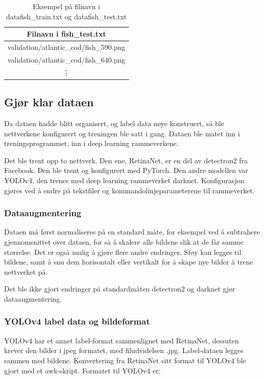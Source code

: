 \begin{table}[b]
\bigskip
\centering
\caption{Eksempel på filnavn i data\/fish\_train.txt og data\/fish\_test.txt}
\label{tab:fish} 
\begin{tabular}[t]{c}
\toprule
Filnavn i fish\_test.txt \\
\midrule
validation/atlantic\_cod/fish\_590.png \\
validation/atlantic\_cod/fish\_640.png \\
\vdots \\
\bottomrule	
\end{tabular}
\end{table}

\subsection{Gjør klar dataen}

Da dataen hadde blitt organisert, og label data nøye konstruert, så ble nettverkene konfigurert og treningen ble satt i gang. Dataen ble matet inn i treningsprogrammet, inn i deep learning rammeverkene.

Det ble trent opp to nettverk. Den ene, RetinaNet, er en del av detectron2 fra Facebook. Den ble trent og konfigurert med PyTorch. Den andre modellen var YOLOv4, den trenes med deep learning rammeverket darknet. Konfigurasjon gjøres ved å endre på tekstfiler og kommandolinjeparameterene til rammeverket.

\subsubsection{Dataaugmentering}

Dataen må først normaliseres på en standard måte, for eksempel ved å subtrahere gjennomsnittet over dataen, for så å skalere alle bildene slik at de får samme størrelse. Det er også mulig å gjøre flere andre endringer. Støy kan legges til bildene, samt å snu dem horisontalt eller vertikalt for å skape nye bilder å trene nettverket på.

Det ble ikke gjort endringer på standardmåten detectron2 og darknet gjør dataaugmentering.

\subsubsection{YOLOv4 label data og bildeformat}

YOLOv4 har et annet label-format sammenlignet med RetinaNet, dessuten krever den bilder i jpeg formatet, med filudvidelsen .jpg. Label-dataen legges sammen med bildene. Konvertering fra RetinaNet sitt format til YOLOv4 ble gjort med et awk-skript. Formatet til YOLOv4 er:

